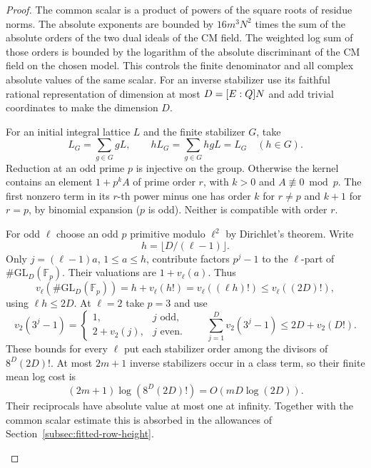 \begin{proof}

The common scalar is a product of powers of the square roots
of residue norms. The absolute exponents are bounded by
\(16m^3N^2\) times the sum of the absolute orders of the two dual ideals of the CM field. The weighted log sum of those
orders is bounded by the logarithm of the absolute discriminant of the CM field
on the chosen model. This controls the finite denominator
and all complex absolute values of the same scalar. For an inverse stabilizer use its faithful rational representation of
dimension at most \(D=[E:Q]N\) and add trivial coordinates to
make the dimension \(D\).

For an initial integral lattice \(L\) and the finite stabilizer \(G\), take
\[
  L_G=\sum_{g\in G}gL,\qquad hL_G=\sum_{g\in G}hgL=L_G\quad(h\in G).
\]
 Reduction at an odd
prime \(p\) is injective on the group. Otherwise the kernel contains
an element \(1+p^kA\) of prime order \(r\), with \(k>0\) and
\(A\not\equiv0\bmod p\). The first nonzero term in its \(r\)-th
power minus one has order \(k\) for \(r\ne p\) and \(k+1\)
for \(r=p\), by binomial expansion (\(p\) is odd). Neither is
compatible with order \(r\).

For odd \(\ell\) choose an odd \(p\) primitive modulo \(\ell^2\)
by Dirichlet's theorem. Write 
\[
  h=\lfloor D/(\ell-1)\rfloor.
\]
Only \(j=(\ell-1)a\), \(1\le a\le h\), contribute factors
\(p^j-1\) to the \(\ell\)-part of \(\#\mathrm{GL}_D(\mathbb F_p)\).
Their valuations are \(1+v_\ell(a)\). Thus
\[
 v_\ell(\#\mathrm{GL}_D(\mathbb F_p))
     =h+v_\ell(h!)=v_\ell((\ell h)!)\le v_\ell((2D)!),
\]
using \(\ell h\le2D\). At \(\ell=2\) take \(p=3\) and use
\[
 v_2(3^j-1)=\begin{cases}1,&j\text{ odd},\\2+v_2(j),&j\text{ even}.\end{cases}
 \qquad \sum_{j=1}^D v_2(3^j-1)\le 2D+v_2(D!).
\]
These bounds for every \(\ell\) put each stabilizer order
among the divisors of \(8^D(2D)!\). At most \(2m+1\) inverse
stabilizers occur in a class term, so their finite mean
log cost is 
\[
  (2m+1)\log(8^D(2D)!)=O(mD\log(2D)).
\]
Their reciprocals have absolute value at most one at infinity.
Together with the common scalar estimate this is absorbed
in the allowances of Section~\ref{subsec:fitted-row-height}.

\label{cor:fitted-evaluation-4}



\end{proof}
